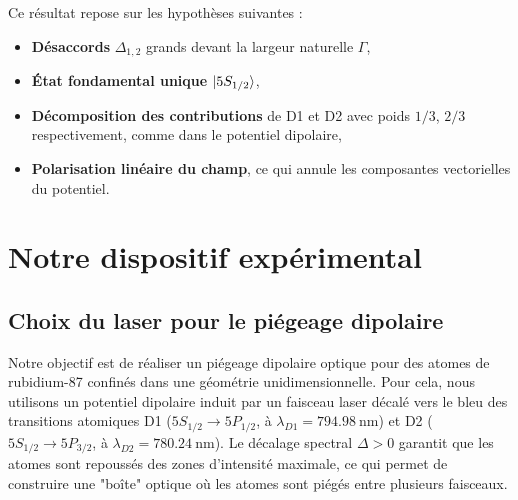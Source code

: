 Ce résultat repose sur les hypothèses suivantes :
\begin{itemize}[label = $\bullet$]
	\item {\bf Désaccords} $\Delta_{1,2}$  grands devant la largeur naturelle $\Gamma$,
	\item {\bf État fondamental unique} $\ket{5S_{1/2}}$,
	\item {\bf Décomposition des contributions} de D1 et D2 avec poids $1/3$, $2/3$ respectivement, comme dans le potentiel dipolaire,
	\item {\bf Polarisation linéaire du champ}, ce qui annule les composantes vectorielles du potentiel.
\end{itemize}






\section{Notre dispositif expérimental}

\subsection{Choix du laser pour le piégeage dipolaire}

Notre objectif est de réaliser un piégeage dipolaire optique pour des atomes de rubidium-87 confinés dans une géométrie unidimensionnelle. Pour cela, nous utilisons un potentiel dipolaire induit par un faisceau laser décalé vers le bleu des transitions atomiques D1 ($5S_{1/2} \rightarrow 5P_{1/2}$, à $\lambda_{D1} = 794.98~\text{nm}$) et D2 ($5S_{1/2} \rightarrow 5P_{3/2}$, à $\lambda_{D2} = 780.24~\text{nm}$). Le décalage spectral $\Delta > 0$ garantit que les atomes sont repoussés des zones d’intensité maximale, ce qui permet de construire une "boîte" optique où les atomes sont piégés entre plusieurs faisceaux.

